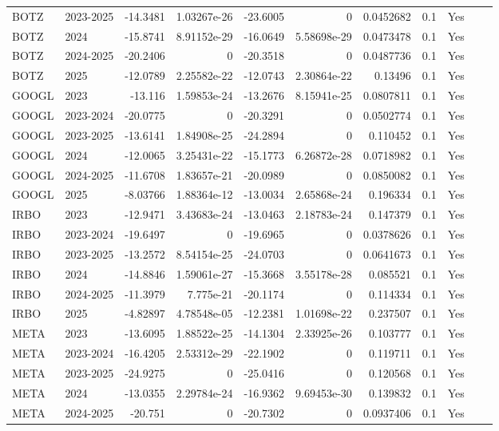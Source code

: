 \begin{longtable}{llrrrrrrrrl}
BOTZ & 2023-2025 & -14.3481 & 1.03267e-26 & -23.6005 & 0 & 0.0452682 & 0.1 & Yes &  \\
BOTZ & 2024 & -15.8741 & 8.91152e-29 & -16.0649 & 5.58698e-29 & 0.0473478 & 0.1 & Yes &  \\
BOTZ & 2024-2025 & -20.2406 & 0 & -20.3518 & 0 & 0.0487736 & 0.1 & Yes &  \\
BOTZ & 2025 & -12.0789 & 2.25582e-22 & -12.0743 & 2.30864e-22 & 0.13496 & 0.1 & Yes &  \\
GOOGL & 2023 & -13.116 & 1.59853e-24 & -13.2676 & 8.15941e-25 & 0.0807811 & 0.1 & Yes &  \\
GOOGL & 2023-2024 & -20.0775 & 0 & -20.3291 & 0 & 0.0502774 & 0.1 & Yes &  \\
GOOGL & 2023-2025 & -13.6141 & 1.84908e-25 & -24.2894 & 0 & 0.110452 & 0.1 & Yes &  \\
GOOGL & 2024 & -12.0065 & 3.25431e-22 & -15.1773 & 6.26872e-28 & 0.0718982 & 0.1 & Yes &  \\
GOOGL & 2024-2025 & -11.6708 & 1.83657e-21 & -20.0989 & 0 & 0.0850082 & 0.1 & Yes &  \\
GOOGL & 2025 & -8.03766 & 1.88364e-12 & -13.0034 & 2.65868e-24 & 0.196334 & 0.1 & Yes &  \\
IRBO & 2023 & -12.9471 & 3.43683e-24 & -13.0463 & 2.18783e-24 & 0.147379 & 0.1 & Yes &  \\
IRBO & 2023-2024 & -19.6497 & 0 & -19.6965 & 0 & 0.0378626 & 0.1 & Yes &  \\
IRBO & 2023-2025 & -13.2572 & 8.54154e-25 & -24.0703 & 0 & 0.0641673 & 0.1 & Yes &  \\
IRBO & 2024 & -14.8846 & 1.59061e-27 & -15.3668 & 3.55178e-28 & 0.085521 & 0.1 & Yes &  \\
IRBO & 2024-2025 & -11.3979 & 7.775e-21 & -20.1174 & 0 & 0.114334 & 0.1 & Yes &  \\
IRBO & 2025 & -4.82897 & 4.78548e-05 & -12.2381 & 1.01698e-22 & 0.237507 & 0.1 & Yes &  \\
META & 2023 & -13.6095 & 1.88522e-25 & -14.1304 & 2.33925e-26 & 0.103777 & 0.1 & Yes &  \\
META & 2023-2024 & -16.4205 & 2.53312e-29 & -22.1902 & 0 & 0.119711 & 0.1 & Yes &  \\
META & 2023-2025 & -24.9275 & 0 & -25.0416 & 0 & 0.120568 & 0.1 & Yes &  \\
META & 2024 & -13.0355 & 2.29784e-24 & -16.9362 & 9.69453e-30 & 0.139832 & 0.1 & Yes &  \\
META & 2024-2025 & -20.751 & 0 & -20.7302 & 0 & 0.0937406 & 0.1 & Yes &  \\

\end{longtable}
